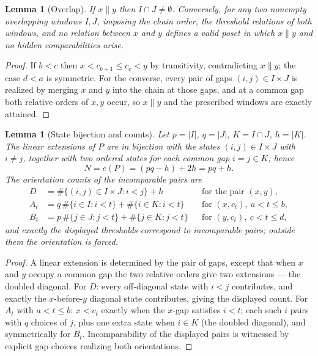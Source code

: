 \documentclass[11pt]{article}
\newtheorem{lemma}[theorem]{Lemma}
\theoremstyle{definition}
\theoremstyle{remark}
\begin{document}
\begin{lemma}[Overlap]\label{lem:overlap}
If $x\parallel y$ then $I\cap J\neq\emptyset$. Conversely, for any two nonempty
overlapping windows $I,J$, imposing the chain order, the threshold relations of both
windows, and no relation between $x$ and $y$ defines a valid poset in which $x\parallel y$
and no hidden comparabilities arise.
\end{lemma}

\begin{proof}
If $b<c$ then $x<c_{b+1}\le c_c<y$ by transitivity, contradicting $x\parallel y$; the case
$d<a$ is symmetric. For the converse, every pair of gaps $(i,j)\in I\times J$ is realized
by merging $x$ and $y$ into the chain at those gaps, and at a common gap both relative
orders of $x,y$ occur, so $x\parallel y$ and the prescribed windows are exactly attained.
\end{proof}

\begin{lemma}[State bijection and counts]\label{lem:states}
Let $p=|I|$, $q=|J|$, $K=I\cap J$, $h=|K|$. The linear extensions of $P$ are in bijection
with the states $(i,j)\in I\times J$ with $i\ne j$, together with two ordered states for
each common gap $i=j\in K$; hence
\[
N=e(P)=(pq-h)+2h=pq+h.
\]
The orientation counts of the incomparable pairs are
\begin{align*}
D&=\#\{(i,j)\in I\times J: i<j\}+h &&\text{for the pair }(x,y),\\
A_t&=q\,\#\{i\in I: i<t\}+\#\{i\in K: i<t\} &&\text{for }(x,c_t),\ a<t\le b,\\
B_t&=p\,\#\{j\in J: j<t\}+\#\{j\in K: j<t\} &&\text{for }(y,c_t),\ c<t\le d,
\end{align*}
and exactly the displayed thresholds correspond to incomparable pairs; outside them the
orientation is forced.
\end{lemma}

\begin{proof}
A linear extension is determined by the pair of gaps, except that when $x$ and $y$ occupy
a common gap the two relative orders give two extensions --- the doubled diagonal. For
$D$: every off-diagonal state with $i<j$ contributes, and exactly the $x$-before-$y$
diagonal state contributes, giving the displayed count. For $A_t$ with $a<t\le b$: $x<c_t$
exactly when the $x$-gap satisfies $i<t$; each such $i$ pairs with $q$ choices of $j$,
plus one extra state when $i\in K$ (the doubled diagonal), and symmetrically for $B_t$.
Incomparability of the displayed pairs is witnessed by explicit gap choices realizing both
orientations.
\end{proof}
\end{document}
